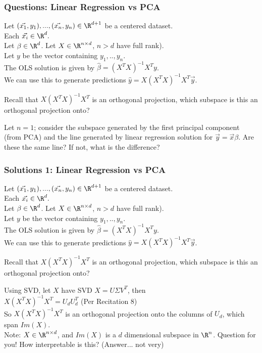 \documentclass{beamer}
\renewenvironment{enumerate}%
{\begin{list}{\arabic{enumi}.}%
      {\setlength{\leftmargin}{2.5em}%
       \setlength{\itemsep}{-\parsep}%
       \setlength{\topsep}{-\parskip}%
       \usecounter{enumi}}%
 }{\end{list}}
\begin{document}
\begin{frame}
\frametitle{Questions: Linear Regression vs PCA}
Let $(\vec{x_1},y_1),...,(\vec{x_n},y_n) \in \R^{d+1}$ be a centered dataset.\\
 Each $\vec{x_i}\in\R^d.$\\
Let $\beta \in \R^d$. Let $X\in\R^{n\times d}$, $n>d$ have full rank).\\
Let $y$ be the vector containing $y_1,..,y_n$.\\
The OLS solution is given by $\hat{\beta} = (X^TX)^{-1}X^Ty$.  \\
We can use this to generate predictions $\hat{y} = X(X^TX)^{-1}X^T\vec{y}$.\\

\begin{enumerate}
\item Recall that $X(X^TX)^{-1}X^T$ is an orthogonal projection, which subspace is this an orthogonal projection onto? 
\medskip
\item Let $n = 1$; consider the subspace generated by the first principal component (from PCA) and the line generated by linear regression solution for $\vec{y}=\vec{x}\beta$.
Are these the same line? If not, what is the difference?
\end{enumerate}
\end{frame}

\begin{frame}
\frametitle{Solutions 1: Linear Regression vs PCA}
Let $(\vec{x_1},y_1),...,(\vec{x_n},y_n) \in \R^{d+1}$ be a centered dataset.\\
 Each $\vec{x_i}\in\R^d.$\\
Let $\beta \in \R^d$. Let $X\in\R^{n\times d}$, $n>d$ have full rank).\\
Let $y$ be the vector containing $y_1,..,y_n$.\\
The OLS solution is given by $\hat{\beta} = (X^TX)^{-1}X^Ty$.  \\
We can use this to generate predictions $\hat{y} = X(X^TX)^{-1}X^T\vec{y}$.\\

\begin{enumerate}
\item Recall that $X(X^TX)^{-1}X^T$ is an orthogonal projection, which subspace is this an orthogonal projection onto? 
\begin{solution}
Using SVD, let $X$ have SVD $X = U \Sigma V^T$, then \\
\quad $X(X^TX)^{-1}X^T = U_d U_d^T$ \quad (Per Recitation 8) \\  
So $X(X^TX)^{-1}X^T$ is an orthogonal projection onto the columns of $U_d$, which span $Im(X)$. \\
Note: $X\in \R^{n\times d}$, and  $Im(X)$ is a $d$ dimensional subspace in $\R^n$.
Question for you! How interpretable is this? (Answer... not very)
\end{solution}

\end{enumerate}
\end{frame}
\end{document}
